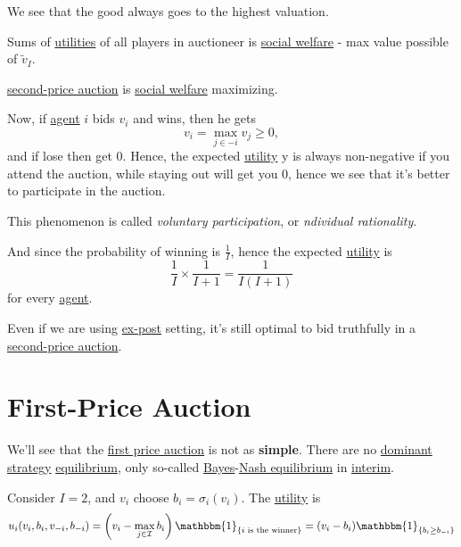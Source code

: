 \begin{remark}
	We see that the good always goes to the highest valuation.
\end{remark}

Sums of \hyperref[def:reward]{utilities} of all players in auctioneer is \hyperref[def:social-welfare]{social welfare} - max value possible of \(\widetilde{v}_{I}\).

\begin{remark}
	\hyperref[eg:second-price-auction]{second-price auction} is \hyperref[def:social-welfare]{social welfare} maximizing.
\end{remark}

Now, if \hyperref[def:player]{agent} \(i\) bids \(v_{i}\) and wins, then he gets
\[
	v_{i} = \max_{j\in -i} v_{j}\geq 0,
\]
and if lose then get \(0\). Hence, the expected \hyperref[def:reward]{utility} y is always non-negative if you attend the auction, while staying
out will get you \(0\), hence we see that it's better to participate in the auction.

\begin{remark}\label{rmk:voluntary-participation}
	This phenomenon is called \emph{voluntary participation}, or \emph{ndividual rationality}.
\end{remark}

And since the probability of winning is \(\frac{1}{I}\), hence the expected \hyperref[def:reward]{utility} is
\[
	\frac{1}{I}\times \frac{1}{I+1} = \frac{1}{I(I + 1)}
\]
for every \hyperref[def:player]{agent}.

\begin{note}
	Even if we are using \hyperref[def:ex-post]{ex-post} setting, it's still optimal to bid truthfully in a
	\hyperref[eg:second-price-auction]{second-price auction}.
\end{note}

\section{First-Price Auction}
We'll see that the \hyperref[eg:first-price-auction]{first price auction} is not as \textbf{simple}. There are no \hyperref[def:dominant-strategy]{dominant strategy}
\hyperref[def:Nash-equilibrium]{equilibrium}, only so-called \hyperref[def:mathematical-Bayesian-game]{Bayes}-\hyperref[def:Nash-equilibrium]{Nash equilibrium} in
\hyperref[def:interim]{interim}.

Consider \(I = 2\), and \(v_{i}\) choose \(b_{i} = \sigma_{i}(v_{i})\). The \hyperref[def:reward]{utility}  is
\[
	u_{i}(v_{i}, b_{i}, v_{-i}, b_{-i}) = \left(v_{i} - \max_{j\in \mathcal{I} }b_{i}\right)\mathbbm{1}_{\{ i \text{ is the winner} \}} = (v_{i} - b_{i})\mathbbm{1}_{\{ b_{i}\geq b_{-i} \}}
\]


